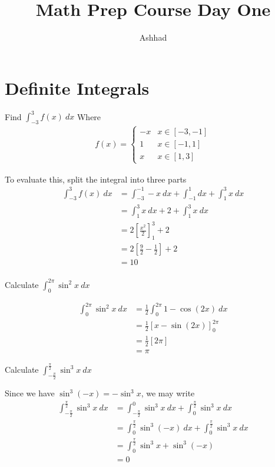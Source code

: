 \documentclass[a4paper]{article}
\title{Math Prep Course Day One}
\author{Ashhad}
\begin{document}
\maketitle

\section{Definite Integrals}

\begin{question}
	Find \(\int_{-3}^{3} f(x)\ dx\) Where 
\begin{align*}
	f(x) = 
	\begin{cases}
		-x & x \in [-3, -1] \\
		1 & x \in [-1, 1] \\
		x & x \in [1, 3] 
	\end{cases}
\end{align*} 
\end{question}

To evaluate this, split the integral into three parts
\begin{align*}
	\int_{-3}^{3} f(x)\ dx &= \int_{-3}^{-1} -x\ dx + \int_{-1}^{1} dx + \int_{1}^{3} x\ dx \\
		&= \int_{1}^{3} x\ dx + 2 + \int_{1}^{3} x\ dx \\
		&= 2\left[\frac{x^2}{2}\right]_{1}^{3} + 2 \\
		&= 2\left[\frac{9}{2} - \frac{1}{2}\right] + 2 \\
		&= 10 \\
\end{align*}

\begin{question}
	Calculate \(\int_{0}^{2\pi} \sin^2 x\ dx\)
\end{question}

\begin{align*}
	\int_{0}^{2\pi} \sin^2 x\ dx &= \frac{1}{2} \int_{0}^{2\pi} 1 - \cos (2x)\ dx \\
	&= \frac{1}{2} \left[x -\sin (2x)\right]_{0}^{2\pi} \\
	&= \frac{1}{2} [2\pi] \\
	&= \pi
\end{align*}

\begin{question}
	Calculate \(\int_{-\frac{\pi}{2}}^{\frac{\pi}{2}} \sin^3 x\ dx\)
\end{question}

Since we have \(\sin^3 (-x) = -\sin^3 x\), we may write
\begin{align*}
	\int_{-\frac{\pi}{2}}^{\frac{\pi}{2}} \sin^3 x\ dx &= \int_{-\frac{\pi}{2}}^{0} \sin^3 x\ dx + \int_{0}^{\frac{\pi}{2}} \sin^3 x\ dx \\
	&= \int_{0}^{\frac{\pi}{2}} \sin^3 (-x)\ dx + \int_{0}^{\frac{\pi}{2}} \sin^3 x\ dx \\
	&= \int_{0}^{\frac{\pi}{2}} \sin^3 x + \sin^3 (-x) \\
	&= 0
\end{align*}
\end{document}
